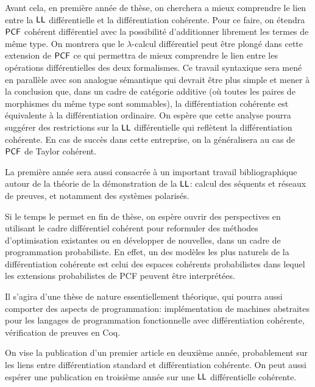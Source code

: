 \documentclass[a4]{article}
\begin{document}
Avant cela, en première année de thèse, on cherchera a mieux
comprendre le lien entre la $\hbox{\textsf{LL}}$ différentielle et la différentiation
cohérente.
%
Pour ce faire, on étendra $\mathsf{PCF}$ cohérent différentiel avec la
possibilité d'additionner librement les termes de même type.
%
On montrera que le $\lambda$-calcul différentiel peut être plongé dans
cette extension de $\mathsf{PCF}$ ce qui permettra de mieux comprendre le lien
entre les opérations différentielles des deux formalismes.
%
Ce travail syntaxique sera mené en parallèle avec son analogue
sémantique qui devrait être plus simple et mener à la conclusion que,
dans un cadre de catégorie additive (où toutes les paires de
morphismes du même type sont sommables), la différentiation cohérente
est équivalente à la différentiation ordinaire.
%
On espère que cette analyse pourra suggérer des restrictions sur la
$\hbox{\textsf{LL}}$ différentielle qui reflètent la différentiation cohérente.
%
En cas de succès dans cette entreprise, on la généralisera au cas de
$\mathsf{PCF}$ de Taylor cohérent.

La première année sera aussi consacrée à un important travail
bibliographique autour de la théorie de la démonstration de la $\hbox{\textsf{LL}}$:
calcul des séquents et réseaux de preuves, et notamment des systèmes
polarisés. 


Si le temps le permet en fin de thèse, on espère ouvrir des
perspectives en utilisant le cadre différentiel cohérent pour
reformuler des méthodes d'optimisation existantes ou en développer de
nouvelles, dans un cadre de programmation probabiliste.
%
En effet, un des modèles les plus naturels de la différentiation
cohérente est celui des espaces cohérents probabilistes dans lequel
les extensions probabilistes de PCF peuvent être interprétées.

Il s'agira d'une thèse de nature essentiellement théorique, qui pourra
aussi comporter des aspects de programmation: implémentation de
machines abstraites pour les langages de programmation fonctionnelle
avec différentiation cohérente, vérification de preuves en Coq.

On vise la publication d'un premier article en deuxième année,
probablement sur les liens entre différentiation standard et
différentiation cohérente.
%
On peut aussi espérer une publication en troisième année sur une $\hbox{\textsf{LL}}$
différentielle cohérente.




\end{document}

